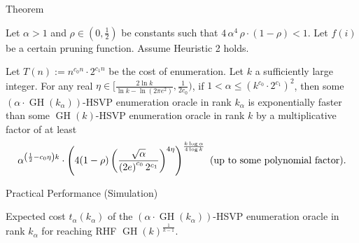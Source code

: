\documentclass[xcolor=table,10pt,aspectratio=169]{beamer}
\DeclareMathOperator{\GH}{GH}
\begin{document}
\begin{frame}[label={sec:orgb644173}]{Theorem}
\begin{theorem}[Informal]
Let \(\alpha > 1\) and \(\rho \in (0, \frac{1}{2})\) be constants such that \(4\,\alpha^{4}\,\rho\cdot (1-\rho) < 1\). Let  \(f(i)\) be a certain pruning function. Assume Heuristic 2 holds.

Let \(T(n):=n^{c_{0}n}\cdot 2^{c_{1}n}\) be the cost of enumeration. Let \(k\) a sufficiently large integer.
For any real  \(\eta \in [\frac{2\ln k}{\ln k-\ln(2\pi e^{2})},\frac{1}{2c_{0}})\), if \(1<  \alpha \le (k^{c_{0}}\cdot 2^{c_{1}})^{2}\), then some \((\alpha\cdot\GH(k_{\alpha}))\)-HSVP enumeration oracle in rank \(k_{\alpha}\)  is exponentially faster than some \(\GH(k)\)-HSVP enumeration oracle in rank \(k\) 
by a multiplicative factor of at least \[\alpha^{\left(\frac{1}{2}-c_{0}\eta\right)k}\cdot \left(4(1-\rho)\left(\frac{\sqrt{\alpha}}{{(2e)}^{c_{0}}\,2^{c_{1}}}\right)^{4\eta}\right)^{\frac{k \log \alpha}{4\log k}} \textnormal{ (up to some polynomial factor)}.\]
\end{theorem}
\end{frame}

\begin{frame}[label={sec:org4a82362}]{Practical Performance (Simulation)}
\tikzset{external/export=true}
\tikzset{external/export=false}

Expected cost \(t_{\alpha}(k_{\alpha})\) of the \((\alpha\cdot\GH(k_{\alpha}))\)-HSVP enumeration oracle in rank \(k_{\alpha}\) for reaching RHF \(\GH{(k)}^{\frac{1}{k-1}}\).
\end{frame}
\end{document}
